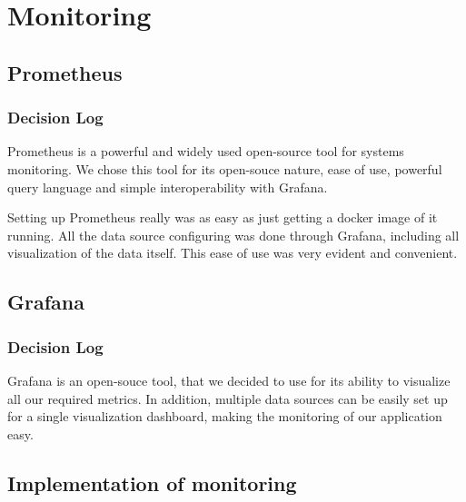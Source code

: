 \section{Monitoring}
\subsection{Prometheus}
\subsubsection{Decision Log}

Prometheus is a powerful and widely used open-source tool for systems monitoring. 
We chose this tool for its open-souce nature, ease of use, powerful query language and simple interoperability with Grafana. 

Setting up Prometheus really was as easy as just getting a docker image of it running. 
All the data source configuring was done through Grafana, including all visualization of the data itself. This ease of use was very evident and convenient.

\subsection{Grafana}

\subsubsection{Decision Log}

Grafana is an open-souce tool, that we decided to use for its ability to visualize all our required metrics. In addition, multiple data sources can be easily set up for a single visualization dashboard, making the monitoring of our application easy.


\subsection{Implementation of monitoring} 

